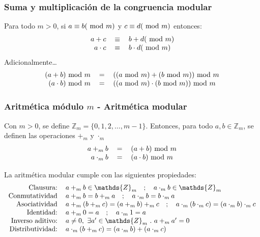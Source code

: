 \documentclass[../main.tex]{subfiles}
\begin{document}
\subsubsection{Suma y multiplicación de la congruencia modular}
Para todo $m > 0$, si $a \equiv b (\text{ mod } m)$ y $c \equiv d (\text{ mod } m)$ entonces:
\[
    \begin{tabular}{rcl}
        $a + c$ & $\equiv$ & $b + d (\modulo m)$\\
        $a \cdot c$ & $\equiv$ & $b \cdot d (\modulo m)$
    \end{tabular}
\]
Adicionalmente\dots
\[
    \begin{tabular}{rcl}
        $(a + b) \modulo m$ & $=$ & $((a \modulo m) + (b \modulo m)) \modulo m$\\
        $(a \cdot b) \modulo m$ & $=$ & $((a \modulo m) \cdot (b \modulo m)) \modulo m$
    \end{tabular}
\]

\subsubsection[Aritmética módulo m]{Aritmética módulo $m$ - Aritmética modular}
Con $m > 0$, se define $\mathds{Z}_m = \{ 0, 1, 2, \ldots, m - 1 \}$. Entonces, para todo $a,b \in \mathds{Z}_m$, se definen las operaciones $+_m$ y $\cdot_m$
\[
    \begin{tabular}{rcl}
        $a +_m b$ & $=$ & $(a+b) \modulo m$\\
        $a \cdot_m b$ & $=$ & $(a \cdot b) \modulo m$
    \end{tabular}
\]

La aritmética modular cumple con las siguientes propiedades:
\[
    \begin{tabular}{rl}
        Clausura: & $a +_m b \in \mathds{Z}_m \quad ; \quad a \cdot_m b \in \mathds{Z}_m$\\
        Conmutatividad & $a +_m b = b +_m a \quad ; \quad a \cdot_m b = b \cdot_m a$\\
        Asociatividad & $a +_m (b +_m c) = (a +_m b) +_m c \quad ; \quad a \cdot_m (b \cdot_m c) = (a \cdot_m b) \cdot_m c$\\
        Identidad: & $a +_m 0 = a \quad ; \quad a \cdot_m 1 = a$\\
        Inverso aditivo: & $a \not= 0,\ \exists a' \in \mathds{Z}_m\ .\ a +_m a' = 0$\\
        Distributividad: & $a \cdot_m (b +_m c) = (a \cdot_m b) + (a \cdot_m c)$\\
    \end{tabular}
\]
\end{document}
